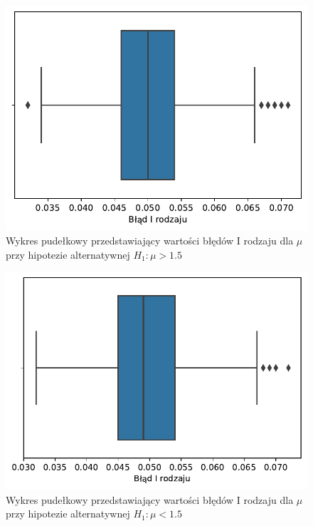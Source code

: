 \documentclass[12pt]{mwart}
\begin{document}
	
	\begin{figure}[H]
	\begin{center}
		\includegraphics[scale=0.6]{box2.pdf}
		\caption{Wykres pudełkowy przedstawiający wartości błędów I rodzaju dla $\mu$ przy hipotezie alternatywnej $H_1 \colon \mu > 1.5$}
	\end{center}
	\end{figure}
	
	
	\begin{figure}[H]
	\begin{center}
		\includegraphics[scale=0.6]{box3.pdf}
		\caption{Wykres pudełkowy przedstawiający wartości błędów I rodzaju dla $\mu$ przy hipotezie alternatywnej $H_1 \colon \mu < 1.5$}
	\end{center}
	\end{figure}
\end{document}
